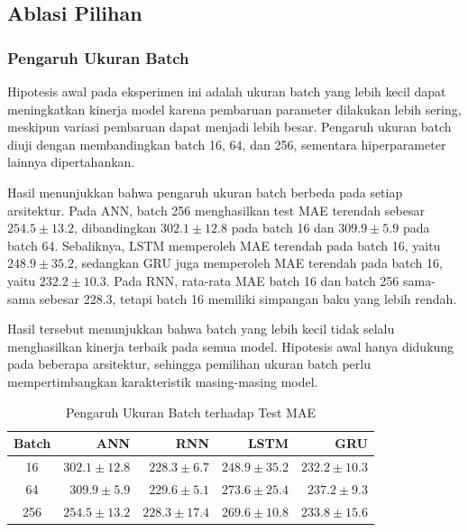 \documentclass[conference,a4paper]{IEEEtran}
\begin{document}
\subsection{Ablasi Pilihan}

\subsubsection{Pengaruh Ukuran Batch}

Hipotesis awal pada eksperimen ini adalah ukuran batch yang
lebih kecil dapat meningkatkan kinerja model karena pembaruan
parameter dilakukan lebih sering, meskipun variasi pembaruan
dapat menjadi lebih besar. Pengaruh ukuran batch diuji dengan
membandingkan batch 16, 64, dan 256, sementara hiperparameter
lainnya dipertahankan.

Hasil menunjukkan bahwa pengaruh ukuran batch berbeda pada
setiap arsitektur. Pada ANN, batch 256 menghasilkan test MAE
terendah sebesar $254.5 \pm 13.2$, dibandingkan
$302.1 \pm 12.8$ pada batch 16 dan $309.9 \pm 5.9$ pada
batch 64. Sebaliknya, LSTM memperoleh MAE terendah pada
batch 16, yaitu $248.9 \pm 35.2$, sedangkan GRU juga
memperoleh MAE terendah pada batch 16, yaitu
$232.2 \pm 10.3$. Pada RNN, rata-rata MAE batch 16 dan
batch 256 sama-sama sebesar 228.3, tetapi batch 16 memiliki
simpangan baku yang lebih rendah.

Hasil tersebut menunjukkan bahwa batch yang lebih kecil
tidak selalu menghasilkan kinerja terbaik pada semua model.
Hipotesis awal hanya didukung pada beberapa arsitektur,
sehingga pemilihan ukuran batch perlu mempertimbangkan
karakteristik masing-masing model.

\begin{table}[!t]
    \centering
    \caption{Pengaruh Ukuran Batch terhadap Test MAE}
    \label{tab:ablasi-batch}
    \footnotesize
    \begin{tabular}{crrrr}
        \toprule
        Batch & ANN & RNN & LSTM & GRU \\
        \midrule
        16
        & $302.1 \pm 12.8$
        & $228.3 \pm 6.7$
        & $248.9 \pm 35.2$
        & $232.2 \pm 10.3$ \\
        64
        & $309.9 \pm 5.9$
        & $229.6 \pm 5.1$
        & $273.6 \pm 25.4$
        & $237.2 \pm 9.3$ \\
        256
        & $254.5 \pm 13.2$
        & $228.3 \pm 17.4$
        & $269.6 \pm 10.8$
        & $233.8 \pm 15.6$ \\
        \bottomrule
    \end{tabular}
\end{table}
\end{document}
